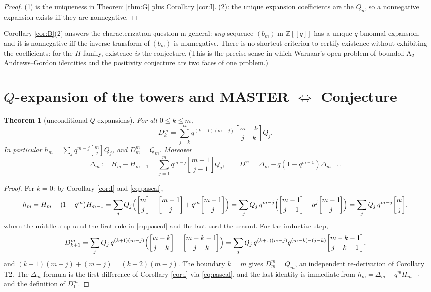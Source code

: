 \documentclass[11pt]{article}
\newtheorem{theorem}{Theorem}
\newcommand{\qbin}[2]{\genfrac{[}{]}{0pt}{}{#1}{#2}}
\newcommand{\ZZ}{\mathbb{Z}}
\begin{document}
\begin{proof}
(1) is the uniqueness in Theorem \ref{thm:G} plus Corollary \ref{cor:I}. (2): the unique
expansion coefficients are the $Q_n$, so a nonnegative expansion exists iff they are
nonnegative.
\end{proof}

Corollary \ref{cor:B}(2) answers the characterization question in general: \emph{any}
sequence $(b_m)$ in $\ZZ[[q]]$ has a unique $q$-binomial expansion, and it is nonnegative
iff the inverse transform of $(b_m)$ is nonnegative. There is no shortcut criterion to
certify existence without exhibiting the coefficients: for the $H$-family, existence
\emph{is} the conjecture. (This is the precise sense in which Warnaar's open problem of
bounded $\mathrm{A}_2$ Andrews--Gordon identities and the positivity conjecture are two
faces of one problem.)

\section{$Q$-expansion of the towers and MASTER $\Leftrightarrow$ Conjecture}

\begin{theorem}[unconditional $Q$-expansions]\label{thm:D}
For all $0\le k\le m$,
\[
D_k^m=\sum_{j=k}^{m}q^{(k+1)(m-j)}\qbin{m-k}{j-k}Q_j .
\]
In particular $h_m=\sum_j q^{m-j}\qbin{m}{j}Q_j$, and $D_m^m=Q_m$. Moreover
\[
\Delta_m:=H_m-H_{m-1}=\sum_{j=1}^{m}q^{m-j}\qbin{m-1}{j-1}Q_j,
\qquad
D_1^m=\Delta_m-q(1-q^{m-1})\Delta_{m-1}.
\]
\end{theorem}

\begin{proof}
For $k=0$: by Corollary \ref{cor:I} and \eqref{eq:pascal},
\[
h_m=H_m-(1-q^m)H_{m-1}
=\sum_j Q_j\Bigl(\qbin{m}{j}-\qbin{m-1}{j}+q^m\qbin{m-1}{j}\Bigr)
=\sum_j Q_j\,q^{m-j}\Bigl(\qbin{m-1}{j-1}+q^{j}\qbin{m-1}{j}\Bigr)
=\sum_j Q_j\,q^{m-j}\qbin{m}{j},
\]
where the middle step used the first rule in \eqref{eq:pascal} and the last used the
second. For the inductive step,
\[
D_{k+1}^m=\sum_j Q_j\,q^{(k+1)(m-j)}\Bigl(\qbin{m-k}{j-k}-\qbin{m-k-1}{j-k}\Bigr)
=\sum_j Q_j\,q^{(k+1)(m-j)}q^{(m-k)-(j-k)}\qbin{m-k-1}{j-k-1},
\]
and $(k+1)(m-j)+(m-j)=(k+2)(m-j)$. The boundary $k=m$ gives $D_m^m=Q_m$, an independent
re-derivation of Corollary T2. The $\Delta_m$ formula is the first difference of
Corollary \ref{cor:I} via \eqref{eq:pascal}, and the last identity is immediate from
$h_m=\Delta_m+q^mH_{m-1}$ and the definition of $D_1^m$.
\end{proof}
\end{document}
